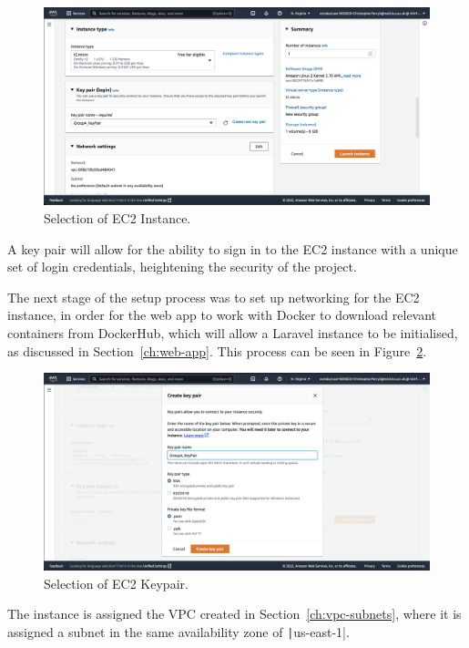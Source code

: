 \clearpage
\begin{figure}[!htbp]
    \centering
    \includegraphics[width=\textwidth]{resources/ec2/create-instance-instance-type}
    \caption{Selection of EC2 Instance.}
    \label{fig:ec2-instance}
\end{figure}

A key pair will allow for the ability to sign in to the EC2 instance with a unique set of login credentials, heightening
the security of the project.

The next stage of the setup process was to set up networking for the EC2 instance, in order for the web app to work with
Docker to download relevant containers from DockerHub, which will allow a Laravel instance to be initialised, as
discussed in Section~\ref{ch:web-app}.
This process can be seen in Figure~\ref{fig:ec2-keypair}.

\begin{figure}[!htbp]
    \centering
    \includegraphics[width=\textwidth]{resources/ec2/create-key-pair}
    \caption{Selection of EC2 Keypair.}
    \label{fig:ec2-keypair}
\end{figure}

The instance is assigned the VPC created in Section~\ref{ch:vpc-subnets}, where it is assigned a subnet in the same
availability zone of \texttt|us-east-1|.

